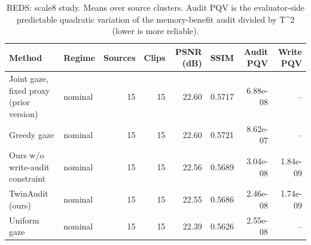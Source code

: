 \begin{table}[t]
\centering
\caption{REDS: scale8 study. Means over source clusters. Audit PQV is the evaluator-side predictable quadratic variation of the memory-benefit audit divided by T^2 (lower is more reliable).}
\label{tab:scale8_REDS}
\small
\begin{tabular}{llrrrrrr}
\toprule
Method & Regime & Sources & Clips & PSNR (dB) & SSIM & Audit PQV & Write PQV \\
\midrule
Joint gaze, fixed proxy (prior version) & nominal & 15 & 15 & 22.60 & 0.5717 & 6.88e-08 & -- \\
Greedy gaze & nominal & 15 & 15 & 22.60 & 0.5721 & 8.62e-07 & -- \\
Ours w/o write-audit constraint & nominal & 15 & 15 & 22.56 & 0.5689 & 3.04e-08 & 1.84e-09 \\
TwinAudit (ours) & nominal & 15 & 15 & 22.55 & 0.5686 & 2.46e-08 & 1.74e-09 \\
Uniform gaze & nominal & 15 & 15 & 22.39 & 0.5626 & 2.55e-08 & -- \\
\bottomrule
\end{tabular}
\end{table}
